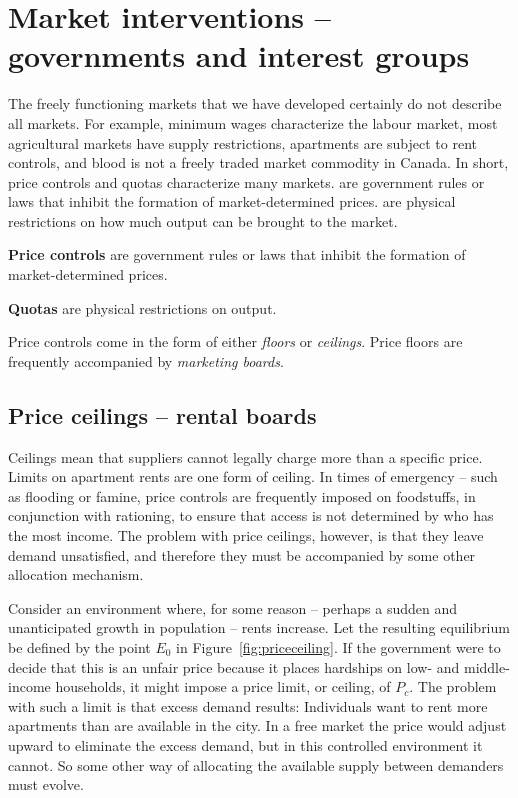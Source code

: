 \section{Market interventions -- governments and interest groups}\label{sec:ch3sec7}

The freely functioning markets that we have developed certainly do not
describe all markets. For example, minimum wages characterize the labour
market, most agricultural markets have supply restrictions, apartments are
subject to rent controls, and blood is not a freely traded market commodity
in Canada. In short, price controls and quotas characterize many markets. %
 are government rules or laws that inhibit the
formation of market-determined prices.  are physical
restrictions on how much output can be brought to the market.

\begin{DefBox}
\textbf{Price controls} are government rules or laws that inhibit the formation of market-determined prices. 

\textbf{Quotas} are physical restrictions on output.
\end{DefBox}

Price controls come in the form of either \textit{floors} or \textit{ceilings}.
Price floors are frequently accompanied by \textit{marketing boards}.

\newhtmlpage

\subsection*{Price ceilings -- rental boards}

Ceilings mean that suppliers cannot legally charge more than a specific
price. Limits on apartment rents are one form of ceiling. In times of
emergency -- such as flooding or famine, price controls are frequently
imposed on foodstuffs, in conjunction with rationing, to ensure that access
is not determined by who has the most income. The problem with price
ceilings, however, is that they leave demand unsatisfied, and therefore they
must be accompanied by some other allocation mechanism.

Consider an environment where, for some reason -- perhaps a sudden and
unanticipated growth in population -- rents increase. Let the resulting
equilibrium be defined by the point $E_0$ in Figure~\ref{fig:priceceiling}.
If the government were to decide that this is an unfair price because it
places hardships on low- and middle-income households, it might impose a
price limit, or ceiling, of $P_c$. The problem with such a limit is that
excess demand results: Individuals want to rent more apartments than are
available in the city. In a free market the price would adjust upward to
eliminate the excess demand, but in this controlled environment it cannot.
So some other way of allocating the available supply between demanders must
evolve.

